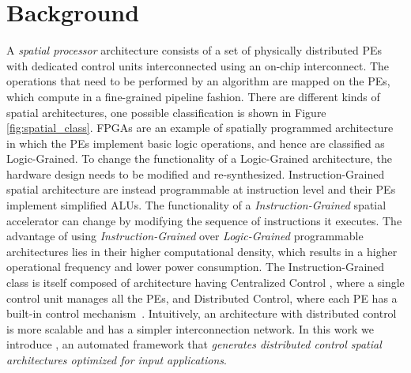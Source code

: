 \section{Background}
\label{sec:bg}

A \textit{spatial processor} architecture consists of a set of physically distributed PEs with dedicated control units interconnected using an on-chip interconnect. The operations that need to be performed by an algorithm are mapped on the PEs, which compute in a fine-grained pipeline fashion. There are different kinds of spatial architectures, one possible classification is shown in Figure \ref{fig:spatial_class}\cite{parashar2014efficient}. FPGAs are an example of spatially programmed architecture in which the PEs implement basic logic operations, and hence are classified as Logic-Grained. To change the functionality of a Logic-Grained architecture, the hardware design needs to be modified and re-synthesized. Instruction-Grained spatial architecture are instead programmable at instruction level and their PEs implement simplified ALUs. The functionality of a \textit{Instruction-Grained} spatial accelerator can change by modifying the sequence of instructions it executes. The advantage of using \textit{Instruction-Grained} over \textit{Logic-Grained} programmable architectures lies in their higher computational density, which results in a higher operational frequency and lower power consumption\cite{parashar2014efficient}. The Instruction-Grained class is itself composed of architecture having Centralized Control\cite{swanson2007wavescalar} , where a single control unit manages all the PEs, and Distributed Control, where each PE has a built-in control mechanism~\cite{parashar2014efficient,prabhakar2017plasticine,cerqueira2020catena}. Intuitively, an architecture with distributed control is more scalable and has a simpler interconnection network.
In this work we introduce \frameworkname, an automated framework that \textit{generates distributed control spatial architectures optimized for input applications}.




